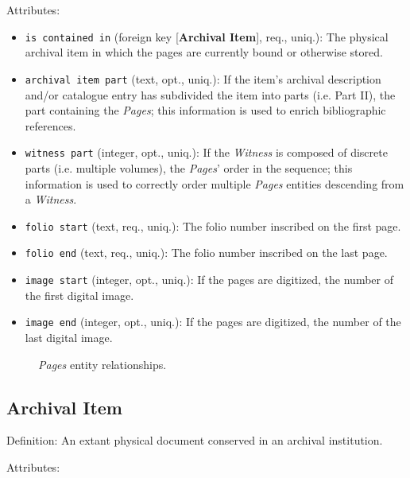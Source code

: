 \vspace{1em}
\noindent Attributes:
\begin{itemize}
    \item \texttt{is contained in} (foreign key [\textbf{Archival Item}], req., uniq.): The physical archival item in which the pages are currently bound or otherwise stored.
    \item \texttt{archival item part} (text, opt., uniq.): If the item's archival description and/or catalogue entry has subdivided the item into parts (i.e. Part II), the part containing the \textit{Pages}; this information is used to enrich bibliographic references.
    \item \texttt{witness part} (integer, opt., uniq.): If the \textit{Witness} is composed of discrete parts (i.e. multiple volumes), the \textit{Pages}' order in the sequence; this information is used to correctly order multiple \textit{Pages} entities descending from a \textit{Witness}.
    \item \texttt{folio start} (text, req., uniq.): The folio number inscribed on the first page.
    \item \texttt{folio end} (text, req., uniq.): The folio number inscribed on the last page.
    \item \texttt{image start} (integer, opt., uniq.): If the pages are digitized, the number of the first digital image.
    \item \texttt{image end} (integer, opt., uniq.): If the pages are digitized, the number of the last digital image.
\end{itemize}

\begin{figure}[ht]
    \begin{center}
        
    \end{center}
\label{fig:PagesER}
\caption{\textit{Pages} entity relationships.}
\end{figure}


\subsection{Archival Item}

Definition: An extant physical document conserved in an archival institution.

\vspace{1em}
\noindent Attributes:

